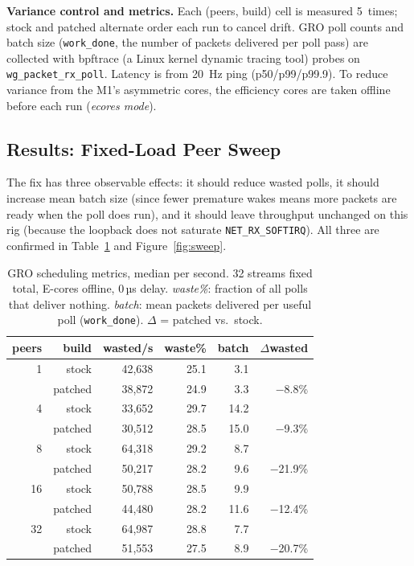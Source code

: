 \documentclass{article}
\begin{document}
\textbf{Variance control and metrics.} Each (peers, build) cell is measured
5~times; stock and patched alternate order each run to cancel drift. GRO poll
counts and batch size (\texttt{work\_done}, the number of packets delivered per
poll pass) are collected with bpftrace (a Linux kernel dynamic tracing tool)
probes on \texttt{wg\_packet\_rx\_poll}. Latency is from 20~Hz ping
(p50/p99/p99.9). To reduce variance from the M1's asymmetric cores, the
efficiency cores are taken offline before each run (\emph{ecores mode}).

\subsection{Results: Fixed-Load Peer Sweep}

The fix has three observable effects: it should reduce wasted polls, it should
increase mean batch size (since fewer premature wakes means more packets are
ready when the poll does run), and it should leave throughput unchanged on this
rig (because the loopback does not saturate \texttt{NET\_RX\_SOFTIRQ}). All
three are confirmed in Table~\ref{tab:gro} and Figure~\ref{fig:sweep}.

\begin{table}[t]
\centering
\caption{GRO scheduling metrics, median per second. 32 streams fixed total,
E-cores offline, 0\,µs delay. \emph{waste\%}: fraction of all polls that
deliver nothing. \emph{batch}: mean packets delivered per useful poll
(\texttt{work\_done}). $\Delta$ = patched vs.\ stock.}
\label{tab:gro}
\small
\begin{tabular}{rrrrrr}
\toprule
peers & build & wasted/s & waste\% & batch & $\Delta$wasted \\
\midrule
1  & stock   & 42,638 & 25.1 & 3.1 & \\
   & patched & 38,872 & 24.9 & 3.3 & $-$8.8\% \\
\midrule
4  & stock   & 33,652 & 29.7 & 14.2 & \\
   & patched & 30,512 & 28.5 & 15.0 & $-$9.3\% \\
\midrule
8  & stock   & 64,318 & 29.2 &  8.7 & \\
   & patched & 50,217 & 28.2 &  9.6 & $-$21.9\% \\
\midrule
16 & stock   & 50,788 & 28.5 &  9.9 & \\
   & patched & 44,480 & 28.2 & 11.6 & $-$12.4\% \\
\midrule
32 & stock   & 64,987 & 28.8 &  7.7 & \\
   & patched & 51,553 & 27.5 &  8.9 & $-$20.7\% \\
\bottomrule
\end{tabular}
\end{table}
\end{document}
